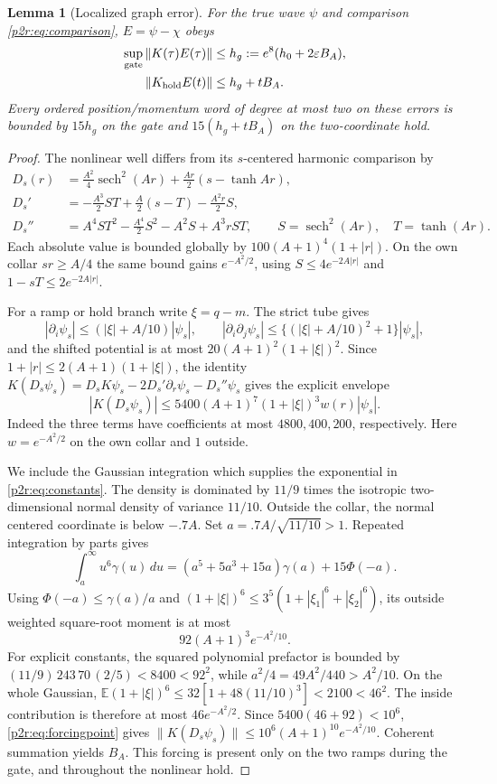 \documentclass[11pt]{article}
\numberwithin{equation}{section}
\newtheorem{lemma}[theorem]{Lemma}
\theoremstyle{definition}
\theoremstyle{remark}
\begin{document}
\begin{lemma}[Localized graph error]\label{p2r:lem:graph}
For the true wave $\psi$ and comparison \eqref{p2r:eq:comparison},
$E=\psi-\chi$ obeys
\begin{align}
 \sup_{\rm gate}\|K(\tau)E(\tau)\|
 &\leq h_g:=e^8(h_0+2\varepsilon B_A),\label{p2r:eq:hgate}\\
 \|K_{\rm hold}E(t)\|&\leq h_g+tB_A .
 \label{p2r:eq:hhold}
\end{align}
Every ordered position/momentum word of degree at most two on these
errors is bounded by $15h_g$ on the gate and
$15(h_g+tB_A)$ on the two-coordinate hold.
\end{lemma}
\begin{proof}
The nonlinear well differs from its $s$-centered harmonic comparison by
\begin{align*}
 D_s(r)&=\tfrac{A^2}4\operatorname{sech}^2(Ar)
                       +\tfrac{Ar}2(s-\tanh Ar),\\
 D_s'&=-\tfrac{A^3}2ST+\tfrac A2(s-T)-\tfrac{A^2r}2S,\\
 D_s''&=A^4ST^2-\tfrac{A^4}2S^2-A^2S+A^3rST,
 \qquad S=\operatorname{sech}^2(Ar),\quad T=\tanh(Ar).
\end{align*}
Each absolute value is bounded globally by
$100(A+1)^4(1+|r|)$. On the own collar $sr\geq A/4$ the same
bound gains $e^{-A^2/2}$, using $S\leq4e^{-2A|r|}$ and
$1-sT\leq2e^{-2A|r|}$.

For a ramp or hold branch write $\xi=q-m$. The strict tube gives
\[
 |\partial_i\psi_s|\leq(|\xi|+A/10)|\psi_s|,\qquad
 |\partial_i\partial_j\psi_s|
 \leq\{(|\xi|+A/10)^2+1\}|\psi_s|,
\]
and the shifted potential is at most
$20(A+1)^2(1+|\xi|)^2$. Since
$1+|r|\leq2(A+1)(1+|\xi|)$,
the identity
$K(D_s\psi_s)=D_sK\psi_s-2D_s'\partial_r\psi_s-D_s''\psi_s$
gives the explicit envelope
\begin{equation}\label{p2r:eq:forcingpoint}
 |K(D_s\psi_s)|
 \leq5400(A+1)^7(1+|\xi|)^3 w(r)|\psi_s|.
\end{equation}
Indeed the three terms have coefficients at most $4800,400,200$,
respectively. Here $w=e^{-A^2/2}$ on the own collar and $1$ outside.

We include the Gaussian integration which supplies the exponential
in \eqref{p2r:eq:constants}. The density is dominated by $11/9$
times the isotropic two-dimensional normal density of variance $11/10$.
Outside the collar, the normal centered coordinate is below $-.7A$.
Set $a=.7A/\sqrt{11/10}>1$. Repeated integration by parts gives
\[
 \int_a^\infty u^6\gamma(u)\,du
 =(a^5+5a^3+15a)\gamma(a)+15\Phi(-a).
\]
Using $\Phi(-a)\leq\gamma(a)/a$ and
$(1+|\xi|)^6\leq3^5(1+|\xi_1|^6+|\xi_2|^6)$, its outside
weighted square-root moment is at most
\[
 92(A+1)^3e^{-A^2/10}.
\]
For explicit constants, the squared polynomial prefactor is bounded
by $(11/9)\,243\,70\,(2/5)<8400<92^2$, while
$a^2/4=49A^2/440>A^2/10$.
On the whole Gaussian,
$\mathbb E(1+|\xi|)^6\leq32[1+48(11/10)^3]<2100<46^2$.
The inside contribution is therefore at most $46e^{-A^2/2}$.
Since $5400(46+92)<10^6$, \eqref{p2r:eq:forcingpoint} gives
$\|K(D_s\psi_s)\|\leq10^6(A+1)^{10}e^{-A^2/10}$.
Coherent summation yields $B_A$. This forcing is present only on
the two ramps during the gate, and throughout the nonlinear hold.


\end{proof}
\end{document}

